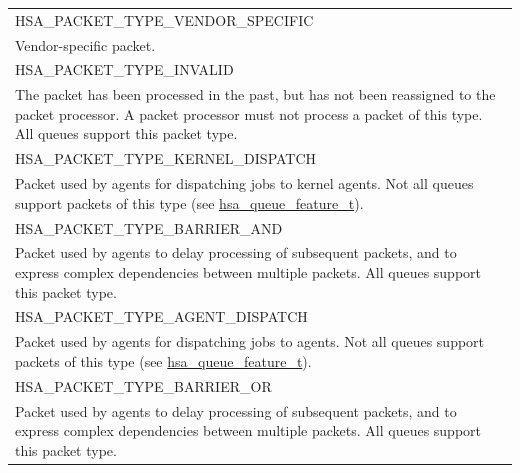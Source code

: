 \documentclass[final,oneside]{book}
\newcommand{\reftyp}[1]{#1}
\newcommand{\refenu}[1]{\reftyp{#1}}
\begin{document}
\begin{longtable}{@{\hspace{2em}}p{\linewidth-2em}}
\hspace{-2em}\refenu{HSA_\-PACKET_\-TYPE_\-VENDOR_\-SPECIFIC}\\Vendor-specific packet.\\[2mm]
\hspace{-2em}\refenu{HSA_\-PACKET_\-TYPE_\-INVALID}\\The packet has been processed in the past, but has not been reassigned to the packet processor. A packet processor must not process a packet of this type. All queues support this packet type.\\[2mm]
\hspace{-2em}\refenu{HSA_\-PACKET_\-TYPE_\-KERNEL_\-DISPATCH}\\Packet used by agents for dispatching jobs to kernel agents. Not all queues support packets of this type (see \hyperlink{group__queue_1ga1145b01f6d9e2670179a22c92db39413}{hsa_\-queue_\-feature_\-t}).\\[2mm]
\hspace{-2em}\refenu{HSA_\-PACKET_\-TYPE_\-BARRIER_\-AND}\\Packet used by agents to delay processing of subsequent packets, and to express complex dependencies between multiple packets. All queues support this packet type.\\[2mm]
\hspace{-2em}\refenu{HSA_\-PACKET_\-TYPE_\-AGENT_\-DISPATCH}\\Packet used by agents for dispatching jobs to agents. Not all queues support packets of this type (see \hyperlink{group__queue_1ga1145b01f6d9e2670179a22c92db39413}{hsa_\-queue_\-feature_\-t}).\\[2mm]
\hspace{-2em}\refenu{HSA_\-PACKET_\-TYPE_\-BARRIER_\-OR}\\Packet used by agents to delay processing of subsequent packets, and to express complex dependencies between multiple packets. All queues support this packet type.
\end{longtable}
\end{document}
